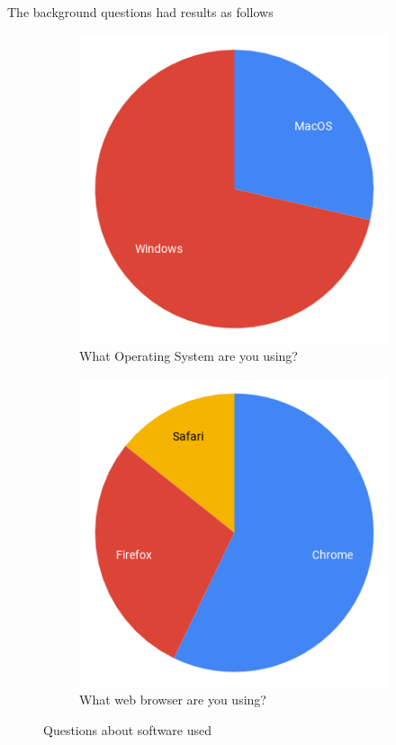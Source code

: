 \documentclass[ %
                    author={Aleena Baig},
                supervisor={Dr Simon Lock},
                    degree={BSc},
                     title={On Making Web Accessible Graphs},
                  subtitle={},
                      year={2019} ]{dissertation}
\begin{document}
The background questions had results as follows

\begin{figure}[H]
  \centering
  \begin{subfigure}[c]{0.4\linewidth}
    \centering
    \includegraphics[width=0.75\linewidth]{images/OperatingSystem.png}
     \caption{What Operating System are you using?}
  \end{subfigure}
  \begin{subfigure}[c]{0.4\linewidth}
    \centering
    \includegraphics[width=0.75\linewidth]{images/WebBrowser.png}
    \caption{What web browser are you using?}
  \end{subfigure}
  \caption{Questions about software used}
  \label{fig:backgroundquestions}
\end{figure}
\end{document}
